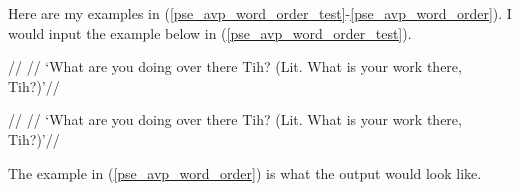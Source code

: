 \documentclass{article}
\begin{document}
  \noindent Here are my examples in (\ref{pse_avp_word_order_test}-\ref{pse_avp_word_order}). I would input the example below in (\ref{pse_avp_word_order_test}). 
   
  \pex[lingstyle=conversation] \label{pse_avp_word_order_test}
    \a[label={DEWI;}]
      \begingl
        //
        //
        \glft `{What are you doing over there Tih? (Lit. What is your work there, Tih?)}'//
      \endgl
  
  

    \a[label={DEWI;}]
      \begingl
        //
        //
        \glft `{What are you doing over there Tih? (Lit. What is your work there, Tih?)}'//
      \endgl
  
  
  \xe
  
  \vspace{2in}
 
 \noindent The example in (\ref{pse_avp_word_order}) is what the output would look like. 
 
\end{document}
